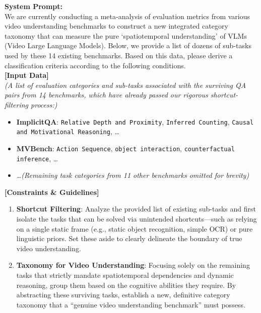         \begin{table}[t!] \centering
        \begin{tcolorbox}[colback=gray!5, colframe=gray!50, arc=2mm, boxrule=0.5pt, left=1.5mm, right=1.5mm, top=1mm, bottom=1mm] \footnotesize
        \textbf{System Prompt:} \\
        \vspace{1mm}
        We are currently conducting a meta-analysis of evaluation metrics from various video understanding benchmarks to construct a new integrated category taxonomy that can measure the pure `spatiotemporal understanding' of VLMs (Video Large Language Models). Below, we provide a list of dozens of sub-tasks used by these 14 existing benchmarks. Based on this data, please derive a classification criteria according to the following conditions. \\
        
        \textbf{[Input Data]} \\
        \textit{(A list of evaluation categories and sub-tasks associated with the surviving QA pairs from 14 benchmarks, which have already passed our rigorous shortcut-filtering process:)}
        \begin{itemize}[leftmargin=*, nosep]
            \item \textbf{ImplicitQA}: \texttt{Relative Depth and Proximity}, \texttt{Inferred Counting}, \texttt{Causal and Motivational Reasoning}, \dots
            \item \textbf{MVBench}: \texttt{Action Sequence}, \texttt{object interaction}, \texttt{counterfactual inference}, \dots
            \item \textit{\dots (Remaining task categories from 11 other benchmarks omitted for brevity)}
        \end{itemize}
        \vspace{1mm}
        
        \textbf{[Constraints \& Guidelines]}
        \begin{enumerate}[leftmargin=*, nosep]
            \item \textbf{Shortcut Filtering}: Analyze the provided list of existing sub-tasks and first isolate the tasks that can be solved via unintended shortcuts---such as relying on a single static frame (e.g., static object recognition, simple OCR) or pure linguistic priors. Set these aside to clearly delineate the boundary of true video understanding.
            \item \textbf{Taxonomy for Video Understanding}: Focusing solely on the remaining tasks that strictly mandate spatiotemporal dependencies and dynamic reasoning, group them based on the cognitive abilities they require. By abstracting these surviving tasks, establish a new, definitive category taxonomy that a ``genuine video understanding benchmark'' must possess.
        \end{enumerate}
        \vspace{1mm}
        

\end{tcolorbox}
\end{table}
